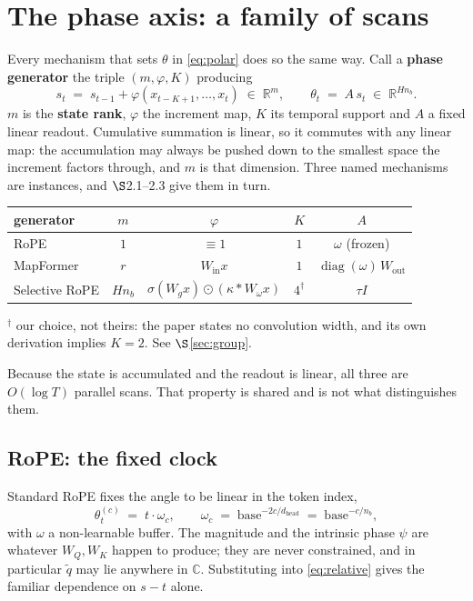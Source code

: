 \documentclass[11pt]{article}
\newcommand{\R}{\mathbb{R}}
\newcommand{\C}{\mathbb{C}}
\newcommand{\hd}{d_{\mathrm{head}}}
\newcommand{\nb}{n_b}
\begin{document}
\section{The phase axis: a family of scans}
\label{sec:phase}

Every mechanism that sets $\theta$ in \eqref{eq:polar} does so the same way. Call a
\textbf{phase generator} the triple $(m,\varphi,K)$ producing
\begin{equation}
  \label{eq:gen}
  \boxed{\;
  s_t \;=\; s_{t-1} + \varphi\!\left(x_{t-K+1},\dots,x_t\right) \;\in\;\R^{m},
  \qquad
  \theta_t \;=\; A\,s_t \;\in\;\R^{H\nb}. \;}
\end{equation}
$m$ is the \textbf{state rank}, $\varphi$ the increment map, $K$ its temporal
support and $A$ a fixed linear readout. Cumulative summation is linear, so it
commutes with any linear map: the accumulation may always be pushed down to the
smallest space the increment factors through, and $m$ is that dimension. Three
named mechanisms are instances, and $\S$2.1--2.3 give them in turn.

\begin{center}\small
\begin{tabular}{lcccc}
\toprule
generator & $m$ & $\varphi$ & $K$ & $A$ \\
\midrule
RoPE           & $1$      & $\equiv 1$                               & $1$ & $\omega$ (frozen) \\
MapFormer      & $r$      & $W_{\mathrm{in}}x$                       & $1$ & $\operatorname{diag}(\omega)\,W_{\mathrm{out}}$ \\
Selective RoPE & $H\nb$   & $\sigma(W_g x)\odot(\kappa * W_\omega x)$ & $4^{\dagger}$ & $\tau I$ \\
\bottomrule
\end{tabular}

\smallskip
{\footnotesize $^{\dagger}$ our choice, not theirs: the paper states no
convolution width, and its own derivation implies $K=2$. See $\S$\ref{sec:group}.}
\end{center}

\noindent Because the state is accumulated and the readout is linear, all three
are $O(\log T)$ parallel scans. That property is shared and is not what
distinguishes them.

\subsection{RoPE: the fixed clock}

Standard RoPE fixes the angle to be linear in the token index,
\begin{equation}
  \theta_t^{(c)} \;=\; t\cdot\omega_c,
  \qquad
  \omega_c \;=\; \text{base}^{-2c/\hd} \;=\; \text{base}^{-c/\nb},
\end{equation}
with $\omega$ a non-learnable buffer. The magnitude and the intrinsic phase
$\psi$ are whatever $W_Q, W_K$ happen to produce; they are never constrained, and
in particular $\tilde q$ may lie anywhere in $\C$. Substituting into
\eqref{eq:relative} gives the familiar dependence on $s-t$ alone.
\end{document}

